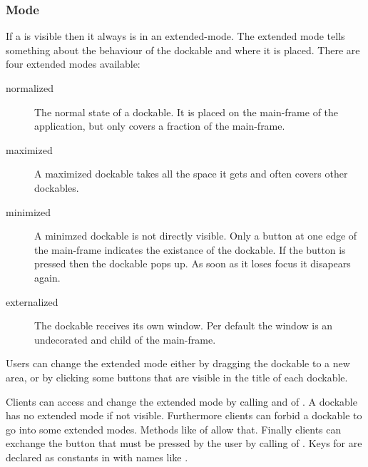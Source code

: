 

\subsubsection{Mode}
If a  is visible then it always is in an extended-mode. The extended mode tells something about the behaviour of the dockable and where it is placed. There are four extended modes available:
\begin{description}
 \item[normalized] The normal state of a dockable. It is placed on the main-frame of the application, but only covers a fraction of the main-frame.
 \item[maximized] A maximized dockable takes all the space it gets and often covers other dockables.
 \item[minimized] A minimzed dockable is not directly visible. Only a button at one edge of the main-frame indicates the existance of the dockable. If the button is pressed then the dockable pops up. As soon as it loses focus it disapears again.
 \item[externalized] The dockable receives its own window. Per default the window is an undecorated  and child of the main-frame.
\end{description}

Users can change the extended mode either by dragging the dockable to a new area, or by clicking some buttons that are visible in the title of each dockable.

Clients can access and change the extended mode by calling \linebreak {} and  of . A dockable has no extended mode if not visible. Furthermore clients can forbid a dockable to go into some extended modes. Methods like  of  allow that. Finally clients can exchange the button that must be pressed by the user by calling  of . Keys for  are declared as  constants in  with names like .

